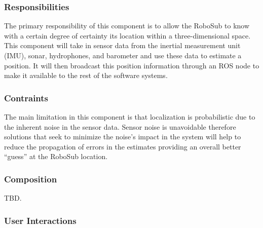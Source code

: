 \subsubsection{Responsibilities}
\label{sec:responsibilities}

The primary responsibility of this component is to allow the RoboSub to know
with a certain degree of certainty its location within a three-dimensional
space. This component will take in sensor data from the inertial measurement
unit (IMU), sonar, hydrophones, and barometer and use these data to estimate a
position. It will then broadcast this position information through an ROS node
to make it available to the rest of the software systems.
\par

\subsubsection{Contraints}
\label{sec:constraints}

The main limitation in this component is that localization is probabilistic due
to the inherent noise in the sensor data. Sensor noise is unavoidable therefore
solutions that seek to minimize the noise’s impact in the system will help to
reduce the propagation of errors in the estimates providing an overall better
``guess'' at the RoboSub location. 
\par

\subsubsection{Composition}
\label{sec:localiztion_composition}

TBD.

\subsubsection{User Interactions}
\label{sec:interactions}

